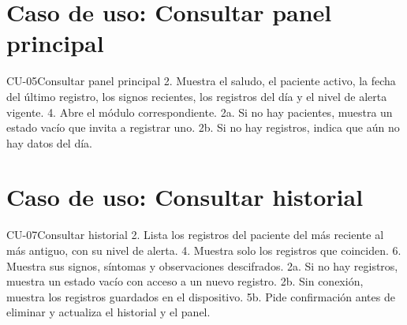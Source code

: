 \section*{Caso de uso: Consultar panel principal}

\begin{table}[H]
\centering
\caption{Especificación del caso de uso CU-05.}
\label{tab:cu-05}
\begin{especificacioncu}{CU-05}{Consultar panel principal}
           {2. Muestra el saludo, el paciente activo, la fecha del último registro, los signos recientes, los registros del día y el nivel de alerta vigente.}
           {4. Abre el módulo correspondiente.}
    \cufinflujo
    \cupaso{}
           {2a. Si no hay pacientes, muestra un estado vacío que invita a registrar uno.}
    \cupaso{}
           {2b. Si no hay registros, indica que aún no hay datos del día.}
    \cufinflujo
\end{especificacioncu}
\end{table}

\section*{Caso de uso: Consultar historial}

\begin{table}[H]
\centering
\caption{Especificación del caso de uso CU-07.}
\label{tab:cu-07}
\begin{especificacioncu}{CU-07}{Consultar historial}
           {2. Lista los registros del paciente del más reciente al más antiguo, con su nivel de alerta.}
           {4. Muestra solo los registros que coinciden.}
           {6. Muestra sus signos, síntomas y observaciones descifrados.}
    \cufinflujo
    \cupaso{}
           {2a. Si no hay registros, muestra un estado vacío con acceso a un nuevo registro.}
    \cupaso{}
           {2b. Sin conexión, muestra los registros guardados en el dispositivo.}
           {5b. Pide confirmación antes de eliminar y actualiza el historial y el panel.}
    \cufinflujo
\end{especificacioncu}
\end{table}

